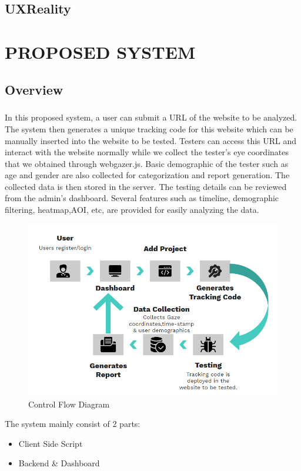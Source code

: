 \documentclass[12pt,a4paper,final]{extreport}
\begin{document}
\section{UXReality}


\newpage
\chapter{PROPOSED SYSTEM}
\section{Overview}
\paragraph{}
In this proposed system, a user can submit a URL of the website to be analyzed. The system then generates a unique tracking code for this website which can be manually inserted into the website to be tested.
Testers can access this URL and interact with the website normally while we collect the tester's eye coordinates that we obtained through webgazer.js. Basic demographic of the tester such as age and gender are also collected for categorization and report generation. The collected data is then stored in the server. 
The testing details can be reviewed from the admin's dashboard. Several features such as timeline, demographic filtering, heatmap,AOI, etc, are provided for easily analyzing the data.
\begin{figure}[H]
    \centering
    \includegraphics[width=\linewidth]{proposed-method.png}
    \caption{Control Flow Diagram}
\end{figure}
The system mainly consist of 2 parts:
\begin{itemize}
	\item Client Side Script
	\item Backend \& Dashboard
\end{itemize}
\end{document}
